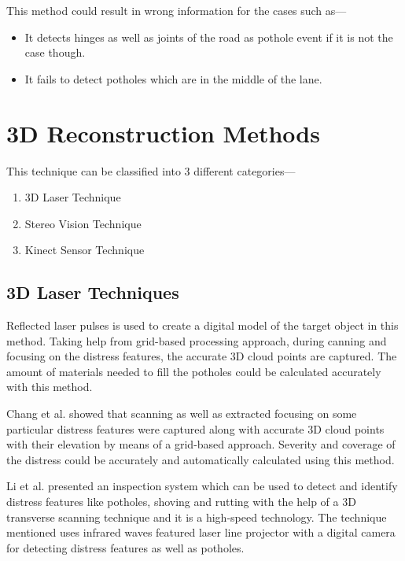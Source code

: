    \vspace{8mm}
    This method could result in wrong information for the cases such as---
    \begin{itemize}
        \item {It detects hinges as well as joints of the road\cite{kim14} as pothole event if it is not the case though.}
        \item{It fails to detect potholes which are in the middle of the lane.}
    \end{itemize}
    
\section{3D Reconstruction Methods}
    This technique can be classified into 3 different categories---
    \begin{enumerate}
        \item {3D Laser Technique}
        \item{Stereo Vision Technique}
        \item{Kinect Sensor Technique}
    \end{enumerate}
    
    \subsection{3D Laser Techniques}
        Reflected laser pulses is used to create a digital model of the target object in this method\cite{akagic17,danti12}. Taking help from grid-based processing approach\cite{kim14}, during canning and focusing on the distress features, the accurate 3D cloud points are captured. The amount of materials needed to fill the potholes could be calculated accurately with this method.
        
        \vspace{8mm}
        Chang et al. showed that scanning as well as extracted focusing on some particular distress features were captured along with accurate 3D cloud points with their elevation by means of a grid-based approach\cite{chang05}. Severity and coverage of the distress could be accurately and automatically calculated using this method\cite{chang05,kim14}.
        
        \vspace{8mm}
        Li et al. presented an inspection system\cite{li09} which can be used to detect and identify distress features like potholes, shoving and rutting with the help of a 3D transverse scanning technique\cite{li09} and it is a high-speed technology. The technique mentioned uses infrared waves featured laser line projector with a digital camera for detecting distress features as well as potholes\cite{li09}. 
        
